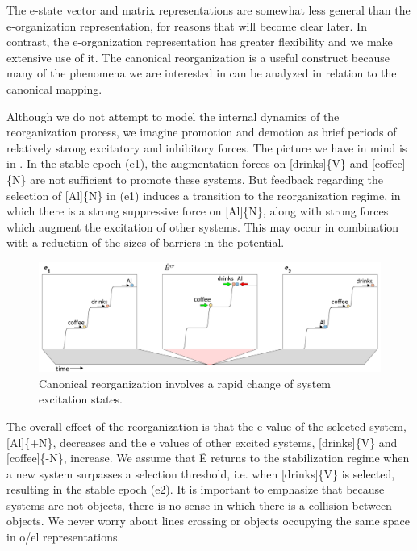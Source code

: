   The e-state vector and matrix representations are somewhat less general than the e-organization representation, for reasons that will become clear later. In contrast, the e-organization representation has greater flexibility and we make extensive use of it. The canonical reorganization is a useful construct because many of the phenomena we are interested in can be analyzed in relation to the canonical mapping.

  Although we do not attempt to model the internal dynamics of the reorganization process, we imagine promotion and demotion as brief periods of relatively strong excitatory and inhibitory forces. The picture we have in mind is in {}. In the stable epoch (e1), the augmentation forces on [drinks]\{V\} and [coffee]\{N\} are not sufficient to promote these systems. But feedback regarding the selection of [Al]\{N\} in (e1) induces a transition to the reorganization regime, in which there is a strong suppressive force on [Al]\{N\}, along with strong forces which augment the excitation of other systems. This may occur in combination with a reduction of the sizes of barriers in the potential. 

  
\begin{figure}
\includegraphics[width=\textwidth]{figures/Tilsen-img26.png}
\caption{Canonical reorganization involves a rapid change of system excitation states.}
\label{fig:2:19}
\end{figure}
 

  The overall effect of the reorganization is that the e value of the selected system, [Al]\{+N\}, decreases and the e values of other excited systems, [drinks]\{V\} and [coffee]\{-N\}, increase. We assume that Ê returns to the stabilization regime when a new system surpasses a selection threshold, i.e. when [drinks]\{V\} is selected, resulting in the stable epoch (e2). It is important to emphasize that because systems are not objects, there is no sense in which there is a collision between objects. We never worry about lines crossing or objects occupying the same space in o/el representations.

